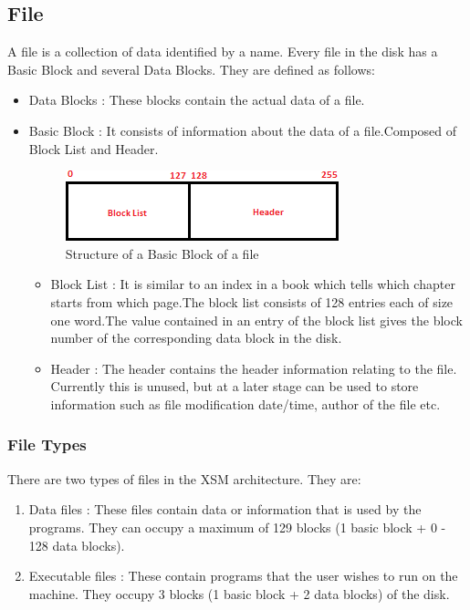 \documentclass[11pt]{article}
\begin{document}
\subsection{File}
A file is a collection of data identified by a name. Every file in the disk has a Basic Block and several Data Blocks. They are defined as follows:
\begin{itemize}
\item Data Blocks : These blocks contain the actual data of a file.
\item Basic Block : It consists of information about the data of a file.Composed of Block List and Header.
 
 \begin{figure}[hbtp]
\begin{center}
\includegraphics[scale=0.5]{fileblock.png}
\end{center}
\caption{Structure of a Basic Block of a file}
\end{figure}
\begin{itemize}
 \item Block List : It is similar to an index in a book which tells which chapter starts from which page.The block list consists of 128 entries each of size one word.The value contained in an entry of the block list gives the block number of the corresponding data block in the disk.
 \item Header : The header contains the header information relating to the file. Currently this is unused, but at a later stage can be used to store information such as file modification date/time, author of the file etc.
 
 \end{itemize}
\end{itemize}


\subsubsection{File Types}
There are two types of files in the XSM architecture. They are:
\begin{enumerate}
\item Data files : These files contain data or information that is used by the programs. They can occupy a maximum of 129 blocks (1 basic block + 0 - 128 data blocks).
\item Executable files : These contain programs that the user wishes to run on the machine. They occupy 3 blocks (1 basic block + 2 data blocks) of the disk.
\end{enumerate}
\end{document}
